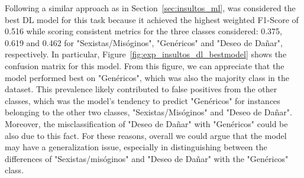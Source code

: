 %            

Following a similar approach as in Section~\ref{sec:insultos_ml}, \textbf{\insscbeto} was considered the best DL model for this task because it achieved the highest weighted F1-Score of 0.516 while scoring consistent metrics for the three classes considered: 0.375, 0.619 and 0.462 for "Sexistas/Misóginos", "Genéricos" and "Deseo de Dañar", respectively. In particular, Figure~\ref{fig:exp_insultos_dl_bestmodel} shows the confusion matrix for this model. From this figure, we can appreciate that the model performed best on "Genéricos", which was also the majority class in the dataset. This prevalence likely contributed to false positives from the other classes, which was the model's tendency to predict "Genéricos" for instances belonging to the other two classes, "Sexistas/Misóginos" and "Deseo de Dañar". Moreover, the misclassification of "Deseo de Dañar" with "Genéricos" could be also due to this fact. For these reasons, overall we could argue that the model may have a generalization issue, especially in distinguishing between the differences of "Sexistas/misóginos" and "Deseo de Dañar" with the "Genéricos" class.





